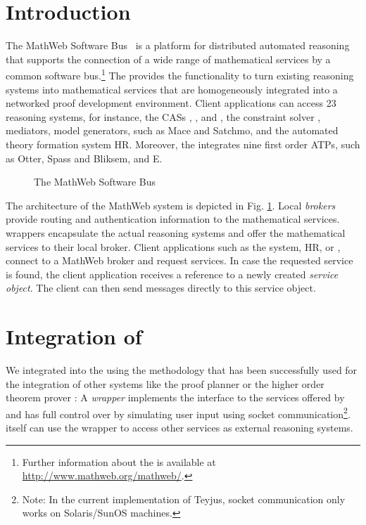 \section{Introduction}
\label{sec:mw-intro}
The MathWeb Software Bus~\cite{FraKoh:mabdl99} is a platform for
distributed automated reasoning that supports the connection of a wide
range of mathematical services by a common software
bus.\footnote{Further information about the {\mathwebsb} is available
  at \url{http://www.mathweb.org/mathweb/}.}  The {\mathwebsb}
provides the functionality to turn existing reasoning systems into
mathematical services that are homogeneously integrated into a
networked proof development environment.  Client applications can
access 23 reasoning systems, for instance, the CASs {\maple},
{\magma}, and {\cocoa}, the constraint solver {\cosie}, mediators,
model generators, such as Mace and Satchmo, and the automated theory
formation system HR.  Moreover, the {\mathwebsb} integrates nine first
order ATPs, such as Otter, Spass and Bliksem, and E.
\begin{figure}[t]
 \begin{center}
   \caption{The MathWeb Software Bus}
   \label{fig:mathweb-arch}
 \end{center}
\end{figure}

The architecture of the MathWeb system is depicted in Fig.
\ref{fig:mathweb-arch}. Local {\em brokers} provide routing and
authentication information to the mathematical services. {\mathwebsb}
wrappers encapsulate the actual reasoning systems and offer the
mathematical services to their local broker.  Client applications such
as the {\OMEGA} system, HR, or {\lclam}, connect to a MathWeb broker
and request services.  In case the requested service is found, the
client application receives a reference to a newly created {\it
  service object}. The client can then send messages directly to this
service object.

\section{Integration of {\lclam}}
\label{sec:mw-integration}
We integrated {\lclam} into the {\mathwebsb} using the methodology
that has been successfully used for the integration of other systems
like the {\OMEGA} proof planner or the higher order theorem prover
{\tps}: A {\mathwebsb} {\it wrapper} implements the interface to the
services offered by {\lclam} and has full control over {\lclam} by
simulating user input using socket communication\footnote{Note: In the
  current implementation of Teyjus, socket communication only works on
  Solaris/SunOS machines.}. {\lclam} itself can use the wrapper to
access other services as external reasoning systems.

